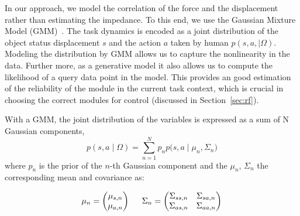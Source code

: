 In our approach, we model the correlation of the force and the displacement rather than estimating the impedance. To this end, we use the Gaussian Mixture Model (GMM)~\cite{cohn1996active}. The task dynamics is encoded as a joint distribution of the object status displacement $s$ and the action $a$ taken by human $p(s,a,{\mid}{\Omega})$.
Modeling the distribution by GMM allows us to capture the nonlinearity in the data. Further more, as a generative model it also allows us to compute the likelihood of a query data point in the model. This provides an good estimation of the reliability of the module in the current task context, which is crucial in choosing the correct modules for control (discussed in Section~\ref{sec:rf}).

With a GMM, the joint distribution of the variables is expressed as a sum of N Gaussian components,
\begin{equation}
{
p(s,a\mid\Omega)
= \sum_{n=1}^N {p_{n}p(s,a\mid{\mu}_n},{\Sigma}_n)
}
\end{equation}
where $p_n$ is the prior of the $n$-th Gaussian component and the ${\mu}_n$, ${\Sigma}_n$ the corresponding mean and covariance as:

\begin{equation}
{
{\mu}_n = \begin{pmatrix}    {\mu}_{s,n}     \\
                             {\mu}_{a,n}          \\
                    \end{pmatrix}
\hspace{0.2in}
{\Sigma}_n = \begin{pmatrix}     {\Sigma}_{ss,n}  &
                                 {\Sigma}_{sa,n} \\
                                 {\Sigma}_{as,n}  &
                                 {\Sigma}_{aa,n}   \\

                        \end{pmatrix}
}
\end{equation}



